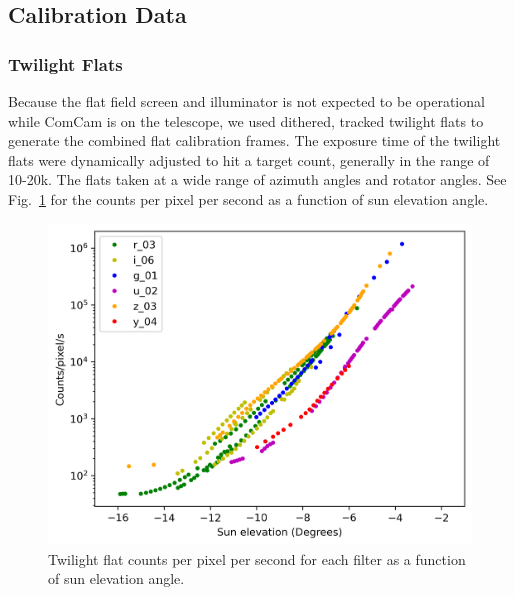 \subsection{Calibration Data}
\label{sec:calibration_date}

\subsubsection{Twilight Flats}

Because the flat field screen and illuminator is not expected to be operational while ComCam is on the telescope, we used dithered, tracked twilight flats to generate the combined flat calibration frames. The exposure time of the twilight flats were dynamically adjusted to hit a target count, generally in the range of 10-20k. The flats taken at a wide range of azimuth angles and rotator angles. See Fig.~\ref{fig:twilight_counts} for the counts per pixel per second as a function of sun elevation angle.

\begin{figure}
  \includegraphics{calibration_data_figures/twilight_flat_counts.png}
  \caption{Twilight flat counts per pixel per second for each filter as a function of sun elevation angle.}
  \label{fig:twilight_counts}
\end{figure}
  